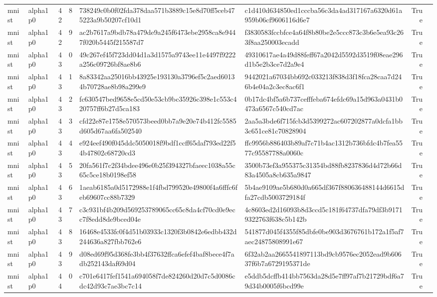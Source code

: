\begin{tabular}{llrrllrl}
mnist & alpha1p0 & 42 & 8 & 738249c0b0f02fda378daa571b3889c15e8d70ff5ceb475223a9b50207cf10d1 & c1d410d634850ed1cccba56c3da4ad317167a6320d61a959b06cf9606116d6e7 & True &  \\
mnist & alpha1p0 & 42 & 9 & ac2b7617a9bdb78a479de9a245f6473ebe2958ca8e9447f020b5445f215587d7 & f3830583fccbfce4a64f8b80be2e5ccc873c3b6e5ea93c263f8aa250003ecadd & True &  \\
mnist & alpha1p0 & 43 & 0 & 49c267ef45f723dd04d1a3d1575a9743ee11e4497f9222a256c09726bf8ae8b6 & 49310617ae4a49d88feff67a2042d5592d3519f08eae296d1b5e2b3ce7d2a9e4 & True &  \\
mnist & alpha1p0 & 43 & 1 & 8a83342aa25016bb43925e193130a3796ef5c2aed60134b70728ae8b98a299e9 & 9442021a67034bb692c033213f838d3f18fca28caa7d246b4e04a2c3ec8ac6f1 & True &  \\
mnist & alpha1p0 & 43 & 2 & fc630547bed9658e5cd50e53cb9bc35926c398e1c553c420757ff6b27d5ca183 & 0b17dc4bf5a6b737cefffeba674efdc69a15d963a0431b0473a6567c540cd7ac & True &  \\
mnist & alpha1p0 & 43 & 3 & cfd22e87e1758e570573beed0bb7a9e20e74b412fc5585d605d67aa6fa502540 & 2aa5a3bde6f715fcb3d5399272ac607202877a0dcfa1bb3c651ce81c70828904 & True &  \\
mnist & alpha1p0 & 43 & 4 & e924eef490f045ddc5050018f9bdf1ccff65daf793ed22f54b47802c68720cd3 & ffc9956b886403b89af7c71b4ac1312b736bfdc4b7fea5577c95587788a0060c & True &  \\
mnist & alpha1p0 & 43 & 5 & 20fa561f7c2f34bdee496e0b25f394327bfaeec1038a55c65c5ce18b0198ef58 & 3500b73ef3a955375c31354bd88fb8237836d4d72b66d83a4505a8cb635a9847 & True &  \\
mnist & alpha1p0 & 43 & 6 & 1aeab6185a0d5172988e1f4fbd799520e49800f4a6fffc6feb69607cc88b7329 & 5b4ae9109ae5b680d0a665df367f880636488144d6615dfa27cdb5003729184f & True &  \\
mnist & alpha1p0 & 43 & 7 & c3c931bf4b209d569253789065cc65c8da4cf70cd0e9ecc7f8edd8de9bced04e & 4c8603ed2d16093b8d3ccd5c181f64737dfa79df3b91719322763f638c5b142b & True &  \\
mnist & alpha1p0 & 43 & 8 & 16468e4533fc0f4d51b03933c1320f3b0842e6edbb432d244636a827fbb762e6 & 541877d045f4355f85dbfe0be903d3676761b172a1f5af7aec24875808991e67 & True &  \\
mnist & alpha1p0 & 43 & 9 & d08ed69f95d368fe3bb4f37632ffca6efef4baf8bece4f7adb252143daf69d04 & 6f32ab2aa2665541897113bd9cb9576ec2052ead9b60637f6b7a6729195371de & True &  \\
mnist & alpha1p0 & 44 & 0 & c701e6417fef1541a694058f7de824260d20d7c5d0086cdc42d93c7ae3bc7c14 & e5ddb5dcffb414bb7563da28d5e7ff97af7b21729bdf6a79d34b0005f6bcd99e & True &  \\

\end{tabular}
